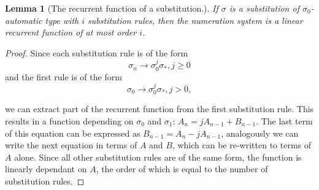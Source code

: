 \documentclass{article}
\newtheorem{lemma}[theorem]{Lemma}
\theoremstyle{definition}
\begin{document}
\begin{lemma}[The recurrent function of a substitution.]
If $\sigma$ is a substitution of $\sigma_0$-automatic type with $i$ 
substitution rules, then the numeration system is a linear recurrent function 
of at most order $i$.
\end{lemma}
\begin{proof}
Since each substitution rule is of the form 
\begin{displaymath}
\sigma_n \rightarrow \sigma_0^j \sigma_*, j \ge 0
\end{displaymath}
and the first rule is of the form
\begin{displaymath}
\sigma_0 \rightarrow \sigma_0^j \sigma_*, j > 0,
\end{displaymath}

we can extract part of the recurrent function from the first substitution rule.
This results in a function depending on $\sigma_0$ and 
$\sigma_1$: $A_n = j A_{n - 1} + B_{n - 1}$. The last term of this 
equation can be expressed as  $B_{n - 1} = A_n - j A_{n - 1}$, analogously we
can write the next equation in terms of $A$ and $B$, which can be re-written 
to terms of $A$ alone. Since all other substitution rules are of the same form,
the function is linearly dependant on $A$, the order of which is equal to the
number of substitution rules.
\end{proof}
\end{document}
